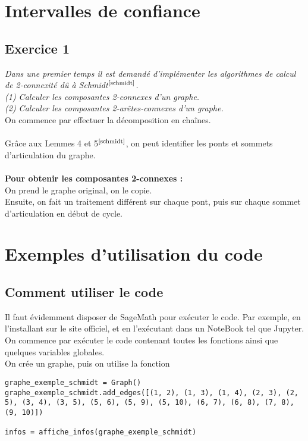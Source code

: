 \documentclass{article}      %
\begin{document}
\section{Intervalles de confiance}
\subsection{Exercice 1}
\textit{\textcolor{exogris}{
Dans une premier temps il est demandé d’implémenter les algorithmes de calcul de 2-connexité dû à Schmidt$^\text{\cite{schmidt}}$.
\\(1) Calculer les composantes 2-connexes d’un graphe.
\\(2) Calculer les composantes 2-arêtes-connexes d’un graphe.
}}
\\On commence par effectuer la décomposition en chaînes.
\\\\Grâce aux Lemmes 4 et 5$^\text{\cite{schmidt}}$, on peut identifier les ponts et sommets d'articulation du graphe.
\\\\\textbf{Pour obtenir les composantes 2-connexes :}
\\On prend le graphe original, on le copie.
\\Ensuite, on fait un traitement différent sur chaque pont, puis sur chaque sommet d'articulation en début de cycle.



\section{Exemples d'utilisation du code}
\subsection{Comment utiliser le code}
Il faut évidemment disposer de SageMath pour exécuter le code.
Par exemple, en l'installant sur le site officiel, et en l'exécutant dans un NoteBook tel que Jupyter.
%
\\ On commence par exécuter le code contenant toutes les fonctions ainsi que quelques variables globales.
%
\\ On crée un graphe, puis on utilise la fonction 

\begin{lstlisting}[style=code-style]
graphe_exemple_schmidt = Graph()
graphe_exemple_schmidt.add_edges([(1, 2), (1, 3), (1, 4), (2, 3), (2, 5), (3, 4), (3, 5), (5, 6), (5, 9), (5, 10), (6, 7), (6, 8), (7, 8), (9, 10)])

infos = affiche_infos(graphe_exemple_schmidt)
\end{lstlisting}
\end{document}
